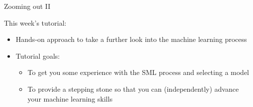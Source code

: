\documentclass[handout]{beamer}
\begin{document}
\begin{frame}{Zooming out II} 
	
	This week's tutorial:
	\begin{itemize}
		\item Hands-on approach to take a further look into the machine learning process
		\item Tutorial goals:
		\begin{itemize}
			\item To get you some experience with the SML process and selecting a model
			\item To provide a stepping stone so that you can (independently) advance your machine learning skills
		\end{itemize}
		
	\end{itemize}
	
\end{frame}
\end{document}
